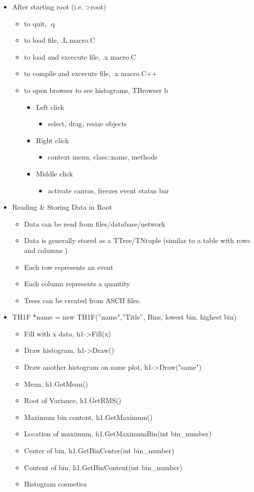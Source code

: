 \documentclass[11pt]{article}
\begin{document}
\begin{itemize}
\item After starting root (i.e. >root)
\begin{itemize}
\item to quit, .q
\item to load file, .L macro.C
\item to load and excecute file, .x macro.C
\item to compile and excecute file, .x macro.C++
\item to open browser to see histograms, TBrowser b
\begin{itemize}
\item Left click
\begin{itemize}
\item select, drag, resize objects
\end{itemize}
\item Right click
\begin{itemize}
\item context menu, class::name, methods
\end{itemize}
\item Middle click
\begin{itemize}
\item activate canvas, freezes event status bar
\end{itemize}
\end{itemize}
\end{itemize}
\item Reading \& Storing Data in Root
\begin{itemize}
\item Data can be read from files/database/network
\item Data is generally stored as a TTree/TNtuple (similar to a table with rows and columns )
\item Each row represents an event
\item Each column represents a quantity
\item Trees can be created from ASCII files.
\end{itemize}
\item TH1F *name = new TH1F(”name",”Title”, Bins, lowest bin, highest bin)
\begin{itemize}
\item Fill with x data, h1->Fill(x)
\item Draw histogram, h1->Draw()
\item Draw another histogram on same plot, h1->Draw("same")
\item Mean, h1.GetMean()
\item Root of Variance, h1.GetRMS()
\item Maximum bin content, h1.GetMaximum()
\item Location of maximum, h1.GetMaximumBin(int bin\_number)
\item Center of bin, h1.GetBinCenter(int bin\_number)
\item Content of bin, h1.GetBinContent(int bin\_number)
\item Histogram cosmetics
\end{itemize}
\end{itemize}
\end{document}
